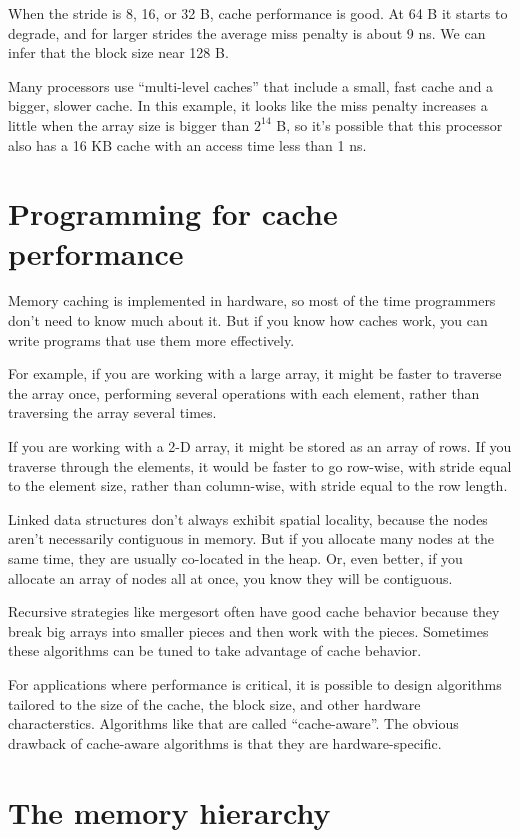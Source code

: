 \documentclass[12pt]{book}
\begin{document}
{When the stride is 8, 16, or 32 B, cache performance is good.  At 64 B
it starts to degrade, and for larger strides the average miss
penalty is about 9 ns.  We can infer that the block size near 128 B.

Many processors use ``multi-level caches'' that include a small,
fast cache and a bigger, slower cache.  In this example, it looks 
like the miss penalty increases a little when the array size is bigger
than $2^{14}$ B, so it's possible that this processor also has a 16 KB
cache with an access time less than 1 ns.


\section{Programming for cache performance}

Memory caching is implemented in hardware, so most of the time
programmers don't need to know much about it.  But if you know how
caches work, you can write programs that use them more effectively.

For example, if you are working with a large array, it might be
faster to traverse the array once, performing several operations with
each element, rather than traversing the array several times.

If you are working with a 2-D array, it might be stored as an array
of rows.  If you traverse through the elements, it would be faster
to go row-wise, with stride equal to the element size, rather
than column-wise, with stride equal to the row length.

Linked data structures don't always exhibit spatial locality, because
the nodes aren't necessarily contiguous in memory.  But if you allocate
many nodes at the same time, they are usually co-located in the heap.
Or, even better, if you allocate an array of nodes all at once, you
know they will be contiguous.

Recursive strategies like mergesort often have good cache behavior
because they break big arrays into smaller pieces and then work
with the pieces.  Sometimes these algorithms can be tuned to take
advantage of cache behavior.

For applications where performance is critical, it is possible
to design algorithms tailored to the size of the cache, the block size,
and other hardware characterstics.  Algorithms like that are
called ``cache-aware''.  The obvious drawback of cache-aware
algorithms is that they are hardware-specific.


\section{The memory hierarchy}

}
\end{document}

